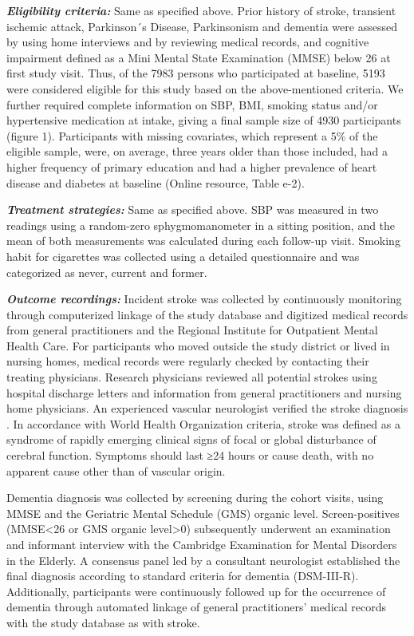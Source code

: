 \documentclass[
]{book}
\begin{document}
\textbf{\emph{Eligibility criteria:}} Same as specified above. Prior history of stroke, transient ischemic attack, Parkinson´s Disease, Parkinsonism and dementia were assessed by using home interviews and by reviewing medical records, and cognitive impairment defined as a Mini Mental State Examination (MMSE) below 26 at first study visit. Thus, of the 7983 persons who participated at baseline, 5193 were considered eligible for this study based on the above-mentioned criteria. We further required complete information on SBP, BMI, smoking status and/or hypertensive medication at intake, giving a final sample size of 4930 participants (figure 1). Participants with missing covariates, which represent a 5\% of the eligible sample, were, on average, three years older than those included, had a higher frequency of primary education and had a higher prevalence of heart disease and diabetes at baseline (Online resource, Table e-2).

\textbf{\emph{Treatment strategies:}} Same as specified above. SBP was measured in two readings using a random-zero sphygmomanometer in a sitting position, and the mean of both measurements was calculated during each follow-up visit. Smoking habit for cigarettes was collected using a detailed questionnaire and was categorized as never, current and former.

\textbf{\emph{Outcome recordings:}} Incident stroke was collected by continuously monitoring through computerized linkage of the study database and digitized medical records from general practitioners and the Regional Institute for Outpatient Mental Health Care. For participants who moved outside the study district or lived in nursing homes, medical records were regularly checked by contacting their treating physicians. Research physicians reviewed all potential strokes using hospital discharge letters and information from general practitioners and nursing home physicians. An experienced vascular neurologist verified the stroke diagnosis \autocite{wieberdink2012,akoudad2015}. In accordance with World Health Organization criteria, stroke was defined as a syndrome of rapidly emerging clinical signs of focal or global disturbance of cerebral function. Symptoms should last ≥24 hours or cause death, with no apparent cause other than of vascular origin.

Dementia diagnosis was collected by screening during the cohort visits, using MMSE and the Geriatric Mental Schedule (GMS) organic level. Screen-positives (MMSE\textless26 or GMS organic level\textgreater0) subsequently underwent an examination and informant interview with the Cambridge Examination for Mental Disorders in the Elderly. A consensus panel led by a consultant neurologist established the final diagnosis according to standard criteria for dementia (DSM-III-R). Additionally, participants were continuously followed up for the occurrence of dementia through automated linkage of general practitioners' medical records with the study database \autocite{debruijn2015,ott1999} as with stroke.
\end{document}
